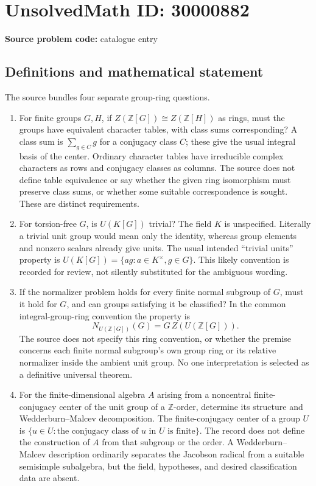 \documentclass[11pt]{article}
\newcommand{\Z}{\mathbb{Z}}
\begin{document}
\section*{UnsolvedMath ID: 30000882}
\textbf{Source problem code:} catalogue entry
\subsection{Definitions and mathematical statement}
The source bundles four separate group-ring questions.
\begin{enumerate}
\item For finite groups $G,H$, if $Z(\Z[G])\cong Z(\Z[H])$ as rings, must the groups have equivalent character tables, with class sums corresponding? A class sum is $\sum_{g\in C}g$ for a conjugacy class $C$; these give the usual integral basis of the center. Ordinary character tables have irreducible complex characters as rows and conjugacy classes as columns. The source does not define table equivalence or say whether the given ring isomorphism must preserve class sums, or whether some suitable correspondence is sought. These are distinct requirements.
\item For torsion-free $G$, is $U(K[G])$ trivial? The field $K$ is unspecified. Literally a trivial unit group would mean only the identity, whereas group elements and nonzero scalars already give units. The usual intended ``trivial units'' property is $U(K[G])=\{ag:a\in K^\times,g\in G\}$. This likely convention is recorded for review, not silently substituted for the ambiguous wording.
\item If the normalizer problem holds for every finite normal subgroup of $G$, must it hold for $G$, and can groups satisfying it be classified? In the common integral-group-ring convention the property is
\[
 N_{U(\Z[G])}(G)=G\,Z(U(\Z[G])).
\]
The source does not specify this ring convention, or whether the premise concerns each finite normal subgroup's own group ring or its relative normalizer inside the ambient unit group. No one interpretation is selected as a definitive universal theorem.
\item For the finite-dimensional algebra $A$ arising from a noncentral finite-conjugacy center of the unit group of a $\Z$-order, determine its structure and Wedderburn--Malcev decomposition. The finite-conjugacy center of a group $U$ is $\{u\in U:\text{the conjugacy class of }u\text{ in }U\text{ is finite}\}$. The record does not define the construction of $A$ from that subgroup or the order. A Wedderburn--Malcev description ordinarily separates the Jacobson radical from a suitable semisimple subalgebra, but the field, hypotheses, and desired classification data are absent.
\end{enumerate}
\end{document}
